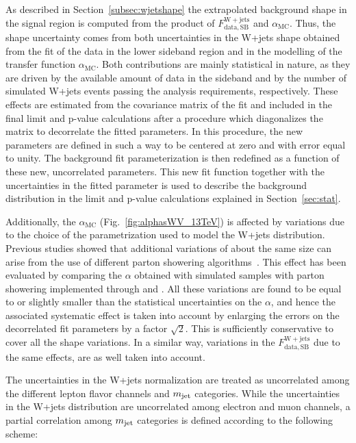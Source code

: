 As described in Section~\ref{subsec:wjetshape} the extrapolated background shape in the signal region is computed from the product of $F_\mathrm{data, SB}^{\mathrm{W+jets}}$ and $\alpha_\mathrm{MC}$.
Thus, the shape uncertainty comes from both uncertainties in the W+jets \mlvj shape obtained from the fit of the data in the lower \mJ sideband region and in the modelling of the transfer function $\alpha_\mathrm{MC}$.
Both contributions are mainly statistical in nature, as they are driven by the available amount of data in the sideband and by the number of simulated W+jets events passing the analysis requirements, respectively.
These effects are estimated from the covariance matrix of the fit and included in the final limit and p-value calculations after a procedure which diagonalizes the matrix to decorrelate the fitted parameters.
In this procedure, the new parameters are defined in such a way to be centered at zero and with error equal to unity. The background fit parameterization is then redefined as a function of these new, uncorrelated parameters.
This new fit function together with the uncertainties in the fitted parameter is used to describe the background distribution in the limit and p-value calculations explained in Section~\ref{sec:stat}.

Additionally, the $\alpha_\mathrm{MC}$ (Fig.~\ref{fig:alphasWV_13TeV}) is affected by variations due to the choice of the parametrization used to model the W+jets distribution.
Previous studies showed that additional variations of about the same size can arise from the use of different parton showering algorithms~\cite{Khachatryan:2014gha}. This effect has been evaluated by comparing the $\alpha$ obtained with simulated samples with parton showering implemented through \HERWIG{++} and \PYTHIA{}. All these variations are found to be equal to or slightly smaller than the statistical uncertainties on the $\alpha$, and hence the associated systematic effect is taken into account by enlarging the errors on the decorrelated fit parameters by a factor $\sqrt{2}$. This is sufficiently conservative to cover all the shape variations.
In a similar way, variations in the $F_\mathrm{data, SB}^{\mathrm{W+jets}}$ due to the same effects, are as well taken into account.

The uncertainties in the W+jets normalization are treated as uncorrelated among the different lepton flavor channels and $m_{\text{jet}}$ categories.
While the uncertainties in the W+jets distribution are uncorrelated among electron and muon channels, a partial correlation among $m_{\text{jet}}$ categories is defined according to the following scheme:

